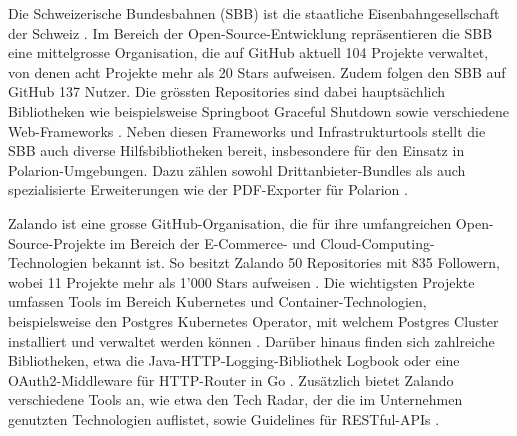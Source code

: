 Die Schweizerische Bundesbahnen (SBB) ist die staatliche Eisenbahngesellschaft der Schweiz \parencite{uvek_verkehr_energie_und_kommunikation_eidgenossisches_departement_fur_umwelt_schweizerische_nodate}. Im Bereich der Open-Source-Entwicklung repräsentieren die SBB eine mittelgrosse Organisation, die auf GitHub aktuell 104 Projekte verwaltet, von denen acht Projekte mehr als 20 Stars aufweisen. Zudem folgen den SBB auf GitHub 137 Nutzer. Die grössten Repositories sind dabei hauptsächlich Bibliotheken wie beispielsweise Springboot Graceful Shutdown sowie verschiedene Web-Frameworks \parencite{noauthor_schweizerischebundesbahnenspringboot-graceful-shutdown_2025}\parencite{noauthor_schweizerischebundesbahnenscion-workbench_2025}\parencite{noauthor_schweizerischebundesbahnenscion-microfrontend-platform_2025}. Neben diesen Frameworks und Infrastrukturtools stellt die SBB auch diverse Hilfsbibliotheken bereit, insbesondere für den Einsatz in Polarion-Umge\-bungen. Dazu zählen sowohl Drittanbieter-Bundles \parencite{noauthor_schweizerischebundesbahnenchsbbpolarionthirdpartybundles_nodate} als auch spezialisierte Erweiterungen wie der PDF-Exporter für Polarion \parencite{noauthor_schweizerischebundesbahnenchsbbpolarionextensionpdf-exporter_2025}\parencite{noauthor_swiss_nodate}.


Zalando ist eine grosse GitHub-Organisation, die für ihre umfangreichen Open-Source-Projekte im Bereich der E-Commerce- und Cloud-Computing-Technologien bekannt ist. So besitzt Zalando 50 Repositories mit 835 Followern, wobei 11 Projekte mehr als 1'000 Stars aufweisen \parencite{noauthor_zalando_nodate}. Die wichtigsten Projekte umfassen Tools im Bereich Kubernetes und Container-Technologien, beispielsweise den Postgres Kubernetes Operator, mit welchem Postgres Cluster installiert und verwaltet werden können \parencite{noauthor_zalandopostgres-operator_2025}. Darüber hinaus finden sich zahlreiche Bibliotheken, etwa die Java-HTTP-Logging-Bibliothek Logbook oder eine OAuth2-Middleware für HTTP-Router in Go \parencite{noauthor_zalandologbook_2025}\parencite{noauthor_zalandogin-oauth2_nodate}. Zusätzlich bietet Zalando verschiedene Tools an, wie etwa den Tech Radar, der die im Unternehmen genutzten Technologien auflistet, sowie Guidelines für RESTful-APIs \parencite{noauthor_zalandotech-radar_nodate}\parencite{noauthor_zalandorestful-api-guidelines_nodate}.

